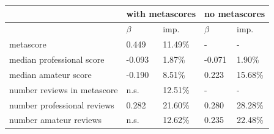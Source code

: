 \documentclass[letterpaper]{article}
\begin{document}
\begin{table}[tb]
\centering
\small
\sffamily


\begin{tabularx}{\linewidth}{llXlX}
& \multicolumn{2}{c}{\textbf{with metascores}} & \multicolumn{2}{c}{\textbf{no metascores}}\\ 
\midrule & \textbf{$\beta$} & imp. & \textbf{$\beta$} & imp.\\ 
metascore & 0.449 & 11.49\% & - & - \\ 
median professional score & -0.093 & 1.87\% & -0.071 & 1.90\% \\ 
median amateur score & -0.190 & 8.51\% & 0.223 & 15.68\% \\ 
number reviews in metascore & n.s. & 12.51\% & - & - \\ 
number professional reviews & 0.282 & 21.60\% & 0.280 & 28.28\% \\ 
number amateur reviews & n.s. & 12.62\% & 0.235 & 22.48\% \\ 


\end{tabularx}
\end{table}
\end{document}
